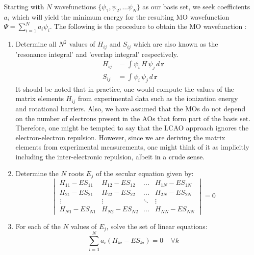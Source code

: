             Starting with $N$ wavefunctions $\{\psi_1, \psi_2, \ldots \psi_N\}$ as our basis set, we seek coefficients $a_{i}$ which will yield the minimum energy for the resulting MO wavefunction $\Psi = \displaystyle\sum_{i=1}^N a_{i} \psi_i$. The following is the procedure to obtain the MO wavefunction :
            \begin{enumerate}
                \item Determine all $N^2$ values of $H_{ij}$ and $S_{ij}$ which are also known as the 'resonance integral' and 'overlap integral' respectively.
                    \begin{equation}\label{eq:resonance and overlap}
                        \begin{aligned}
                            H_{ij} &= \displaystyle\int \psi_i\, H \,\psi_j\, d\,\mathbf{r}\\
                            S_{ij} &= \displaystyle\int \psi_i\, \psi_j\, d\,\mathbf{r}
                        \end{aligned}
                    \end{equation}
                    It should be noted that in practice, one would compute the values of the matrix elements $H_{ij}$ from experimental data such as the ionization energy and rotational barriers. Also, we have assumed that the MOs do not depend on the number of electrons present in the AOs that form part of the basis set. Therefore, one might be tempted to say that the LCAO approach ignores the electron-electron repulsion. However, since we are deriving the matrix elements from experimental measurements, one might think of it as implicitly including the inter-electronic repulsion, albeit in a crude sense.
                \item Determine the $N$ roots $E_j$ of the secular equation given by:
                    \begin{equation}\label{eq:secular}
                        \begin{vmatrix}
                            H_{11} - E S_{11} & H_{12} - E S_{12} & \ldots & H_{1N} - E S_{1N}\\
                            H_{21} - E S_{21} & H_{22} - E S_{22} & \ldots & H_{2N} - E S_{2N}\\
                            \vdots & \vdots & \ddots & \vdots\\
                            H_{N1} - E S_{N1} & H_{N2} - E S_{N2} & \ldots & H_{NN} - E S_{NN}
                        \end{vmatrix}
                        = 0
                    \end{equation}
                \item For each of the $N$ values of $E_j$, solve the set of linear equations:
                    \begin{equation}\label{eq:linear}
                        \displaystyle\sum_{i=1}^N a_i (H_{ki} - E S_{ki}) = 0 \:\:\:\:\: \forall k
                    \end{equation}
            \end{enumerate}
